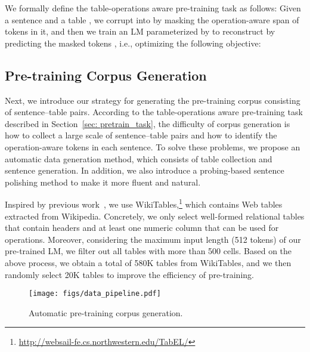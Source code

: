 \documentclass[11pt]{article}
\newcommand{\ie}{{i.e.,}\xspace}
\newcommand{\stitle}[1]{\vspace{1mm}\noindent{\bf #1}}
\begin{document}
We formally define the table-operations aware pre-training task as follows: Given a sentence  and a table , we corrupt  into  by masking the operation-aware span of tokens  in it, and then we train an LM parameterized by  to reconstruct  by predicting the masked tokens , \ie optimizing the following objective:




\subsection{Pre-training Corpus Generation}
\label{sec:pretrain_corpus}

Next, we introduce our strategy for generating the pre-training corpus consisting of sentence--table pairs. According to the table-operations aware pre-training task described in Section~\ref{sec: pretrain_task}, the difficulty of corpus generation is how to collect a large scale of sentence--table pairs and how to identify the operation-aware tokens in each sentence. To solve these problems, we propose an automatic data generation method, which consists of table collection and sentence generation. In addition, we also introduce a probing-based sentence polishing method to make it more fluent and natural.


\stitle{Table Collection.} Inspired by previous work~\cite{tapas,joint}, we use WikiTables,\footnote{\url{http://websail-fe.cs.northwestern.edu/TabEL/}} which contains Web tables extracted from Wikipedia. Concretely, we only select well-formed relational tables 
that contain headers and at least one numeric column that can be used for operations. Moreover, considering the maximum input length (512 tokens) of our pre-trained LM, we filter out all tables with more than 500 cells.
Based on the above process, we obtain a total of 580K tables from WikiTables, and we then randomly select 20K tables to improve the efficiency of pre-training.


\begin{figure}[t!]
	\centering
	\texttt{[image: figs/data\_pipeline.pdf]}
\caption{Automatic pre-training corpus generation.}
\label{fig:data_pipeline}
\end{figure}
\end{document}
